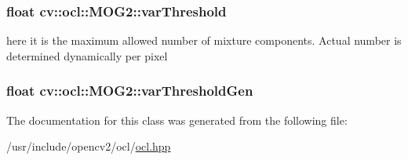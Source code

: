 \hypertarget{classcv_1_1ocl_1_1MOG2_a0872335afe646e84f0dc0e1bf9c370da}{
\subsubsection[{var\-Threshold}]{\setlength{\rightskip}{0pt plus 5cm}float cv\-::ocl\-::\-M\-O\-G2\-::var\-Threshold}}\label{classcv_1_1ocl_1_1MOG2_a0872335afe646e84f0dc0e1bf9c370da}
here it is the maximum allowed number of mixture components. Actual number is determined dynamically per pixel \hypertarget{classcv_1_1ocl_1_1MOG2_a976a659d47c216c12728a639fdf435b7}{
\subsubsection[{var\-Threshold\-Gen}]{\setlength{\rightskip}{0pt plus 5cm}float cv\-::ocl\-::\-M\-O\-G2\-::var\-Threshold\-Gen}}\label{classcv_1_1ocl_1_1MOG2_a976a659d47c216c12728a639fdf435b7}


The documentation for this class was generated from the following file\-:\begin{DoxyCompactItemize}
\item 
/usr/include/opencv2/ocl/\hyperlink{ocl_2ocl_8hpp}{ocl.\-hpp}\end{DoxyCompactItemize}
